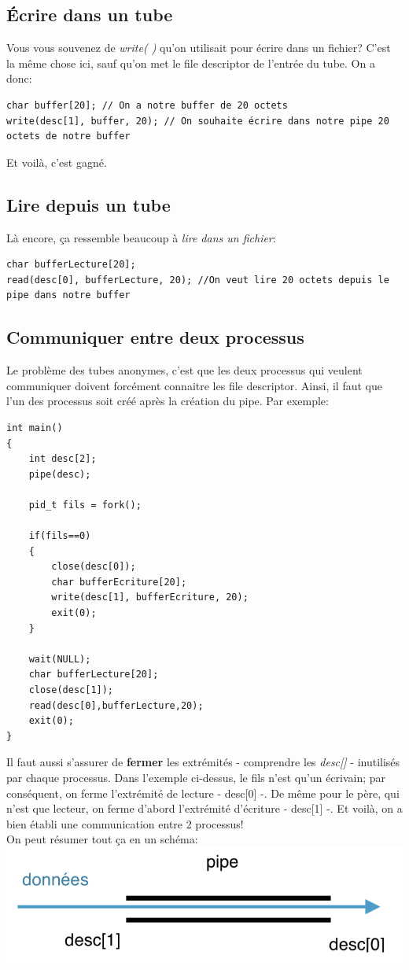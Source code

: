 \documentclass{report}
\begin{document}
\subsection{Écrire dans un tube}
Vous vous souvenez de \emph{write( )} qu'on utilisait pour écrire dans un fichier? C'est la même chose ici, sauf qu'on met le file descriptor de l'entrée du tube. On a donc:
\begin{verbatim}
char buffer[20]; // On a notre buffer de 20 octets
write(desc[1], buffer, 20); // On souhaite écrire dans notre pipe 20 octets de notre buffer
\end{verbatim}
Et voilà, c'est gagné.

\subsection{Lire depuis un tube}
Là encore, ça ressemble beaucoup à \emph{lire dans un fichier}:
\begin{verbatim}
char bufferLecture[20];
read(desc[0], bufferLecture, 20); //On veut lire 20 octets depuis le pipe dans notre buffer
\end{verbatim}

\subsection{Communiquer entre deux processus}
Le problème des tubes anonymes, c'est que les deux processus qui veulent communiquer doivent forcément connaitre les file descriptor. Ainsi, il faut que l'un des processus soit créé après la création du pipe. Par exemple:
\begin{lstlisting}
int main()
{
	int desc[2];
	pipe(desc);
	
	pid_t fils = fork();
	
	if(fils==0)
	{
		close(desc[0]);
		char bufferEcriture[20];
		write(desc[1], bufferEcriture, 20);
		exit(0);
	}
	
	wait(NULL);
	char bufferLecture[20];
	close(desc[1]);
	read(desc[0],bufferLecture,20);
	exit(0);
}
\end{lstlisting}
Il faut aussi s'assurer de \textbf{fermer} les extrémités - comprendre les \emph{desc[]} - inutilisés par chaque processus. Dans l'exemple ci-dessus, le fils n'est qu'un écrivain; par conséquent, on ferme l'extrémité de lecture - desc[0] -. De même pour le père, qui n'est que lecteur, on ferme d'abord l'extrémité d'écriture - desc[1] -.
Et voilà, on a bien établi une communication entre 2 processus!\\
On peut résumer tout ça en un schéma:\\
\includegraphics{pipe}
\end{document}
